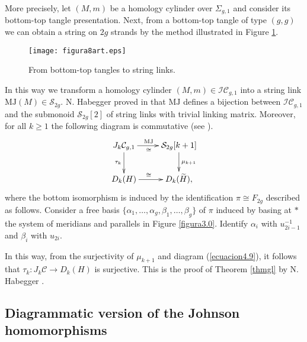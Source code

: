 \documentclass[10pt]{amsart}
\numberwithin{equation}{section}
\numberwithin{equation}{section}
\theoremstyle{definition}
\begin{document}
More precisely, let $(M,m)$ be a homology cylinder over $\Sigma_{g,1}$ and consider its bottom-top tangle presentation. Next, from a bottom-top tangle of type $(g,g)$ we can obtain a string on $2g$ strands by the method illustrated in Figure \ref{figura4.8}. 
\begin{figure}[ht!] 
										\centering
                        \texttt{[image: figura8art.eps]}
												\caption{From  bottom-top tangles to string links.}
												\label{figura4.8}
\end{figure}

In this way we transform a homology cylinder $(M,m)\in\mathcal{IC}_{g,1}$ into a string link $\text{MJ}(M)\in\mathcal{S}_{2g}$. N. Habegger proved in \cite{habegger2000milnor} that $\text{MJ}$ defines a bijection between $\mathcal{IC}_{g,1}$ and the submonoid $\mathcal{S}_{2g}[2]$ of string links with trivial linking matrix. Moreover, for all $k\geq1$ the following diagram is commutative (see \cite[Claim 8.16]{MR2403806}).
\begin{equation}\label{ecuacion4.9}%
\xymatrix{ J_k\mathcal{C}_{g,1}\ar[r]^{\text{MJ}\ \ }_{\cong\ \ }\ar[d]_{\tau_{k}} & \mathcal{S}_{2g}[k+1] \ar[d]^{\mu_{k+1}} \\
						D_k(H)\ar[r]^{\cong\ \ } & D_k(\widetilde{H}),}
\end{equation}
where the bottom isomorphism is induced by the identification $\pi\cong F_{2g}$ described as follows. Consider  a free basis $\{\alpha_1,\ldots,\alpha_g,\beta_1,\ldots,\beta_g\}$ of $\pi$ induced by basing at $*$ the system of meridians and parallels in Figure \ref{figura3.0}. Identify  $\alpha_i$ with $u^{-1}_{2i-1}$ and $\beta_i$ with $u_{2i}$. 

In this way, from the surjectivity of $\mu_{k+1}$ and diagram (\ref{ecuacion4.9}),  it follows that $\tau_k:J_k\mathcal{C}\rightarrow D_k(H)$ is surjective. This is the proof of Theorem \ref{thmgl} by N. Habegger \cite{habegger2000milnor}. 

\subsection{Diagrammatic version of the Johnson homomorphisms}\label{subsection2.5}
\end{document}
